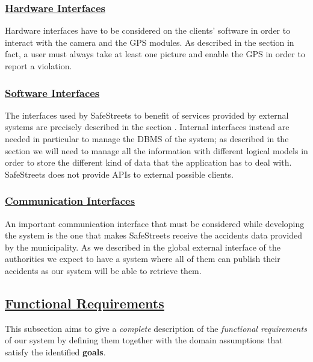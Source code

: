 	\subsubsection[Hardware Interfaces]{\hyperlink{toc}{Hardware Interfaces}}
		Hardware interfaces have to be considered on the clients' software in order to interact with the camera and the GPS modules. As described in the section  in fact, a user must always take at least one picture and enable the GPS in order to report a violation. 
		
	\subsubsection[Software Interfaces]{\hyperlink{toc}{Software Interfaces}}
		The interfaces used by SafeStreets to benefit of services provided by external systems are precisely described in the section . Internal interfaces instead are needed in particular to manage the DBMS of the system; as described in the section  we will need to manage all the information with different logical models in order to store the different kind of data that the application has to deal with. SafeStreets does not provide APIs to external possible clients.
		
	\subsubsection[Communication Interfaces]{\hyperlink{toc}{Communication Interfaces}}
		An important communication interface that must be considered while developing the system is the one that makes SafeStreets receive the accidents data provided by the municipality. As we described in the global external interface of the authorities we expect to have a system where all of them can publish their accidents as our system will be able to retrieve them.
		
	\newpage

\subsection[Functional Requirements]{\hyperlink{toc}{Functional Requirements}}
	\label{sec:functionalRequirements}
	This subsection aims to give a \emph{complete} description of the \emph{functional requirements} of our system by defining them together with the domain assumptions that satisfy the identified \textbf{goals}.
	

